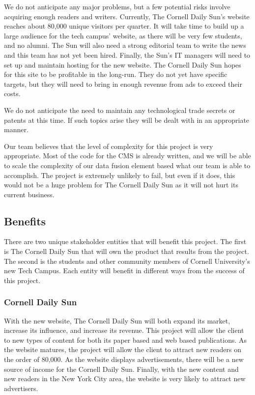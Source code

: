 \documentclass[10pt]{article} %
\begin{document}
We do not anticipate any major problems, but a few potential risks involve acquiring enough readers and writers. Currently, The Cornell Daily Sun’s website reaches about 80,000 unique visitors per quarter. It will take time to build up a large audience for the tech campus’ website, as there will be very few students, and no alumni. The Sun will also need a strong editorial team to write the news and this team has not yet been hired. Finally, the Sun’s IT managers will need to set up and maintain hosting for the new website. The Cornell Daily Sun hopes for this site to be profitable in the long-run. They do not yet have specific targets, but they will need to bring in enough revenue from ads to exceed their costs.

We do not anticipate the need to maintain any technological trade secrets or patents at this time. If such topics arise they will be dealt with in an appropriate manner.

Our team believes that the level of complexity for this project is very appropriate. Most of the code for the CMS is already written, and we will be able to scale the complexity of our data fusion element based what our team is able to accomplish. The project is extremely unlikely to fail, but even if it does, this would not be a huge problem for The Cornell Daily Sun as it will not hurt its current business.

\subsection{Benefits}

There are two unique stakeholder entities that will benefit this project. The first is The Cornell Daily Sun that will own the product that results from the project. The second is the students and other community members of Cornell University’s new Tech Campus. Each entity will benefit in different ways from the success of this project.
                   
\subsubsection{Cornell Daily Sun}
                   
With the new website, The Cornell Daily Sun will both expand its market, increase its influence, and increase its revenue. This project will allow the client to new types of content for both its paper based and web based publications. As the website matures, the project will allow the client to attract new readers on the order of 80,000. As the website displays advertisements, there will be a new source of income for the Cornell Daily Sun. Finally, with the new content and new readers in the New York City area, the website is very likely to attract new advertisers.
                   
\end{document}
